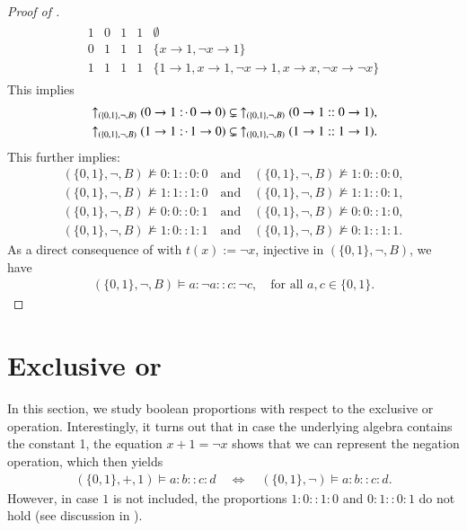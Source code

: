 \documentclass[11pt]{amsart}
\theoremstyle{definition} %
\newcommand{\righttherefore}{:\joinrel\cdot\,}
\begin{document}
\begin{proof}[Proof of ]
\begin{align*}
\begin{array}{cccc||l}
	1 & 0 & 1 & 1 & \emptyset\\ %
	0 & 1 & 1 & 1 & \{x\to 1,\neg x\to 1\}\\
	1 & 1 & 1 & 1 & \{1\to 1,x\to 1,\neg x\to 1,x\to x,\neg x\to\neg x\}
\end{array}
\end{align*} This implies
\begin{align*}
       &\uparrow_{(\{0,1\},\neg,B)}(0\to 1\righttherefore 0\to 0)\subsetneq\ \uparrow_{(\{0,1\},\neg,B)}(0\to 1::0\to 1),\\
       &\uparrow_{(\{0,1\},\neg,B)}(1\to 1\righttherefore 1\to 0)\subsetneq\ \uparrow_{(\{0,1\},\neg,B)}(1\to 1::1\to 1).
\end{align*} This further implies:
\begin{align} 
       \label{equ:BnegB_notmodels_0100_1000} (\{0,1\},\neg,B)\not\models 0:1::0:0 \quad\text{and}\quad (\{0,1\},\neg,B)\not\models 1:0::0:0,\\
       \label{equ:BnegB_notmodels_1110_1101} (\{0,1\},\neg,B)\not\models 1:1::1:0 \quad\text{and}\quad (\{0,1\},\neg,B)\not\models 1:1::0:1,\\
       \label{equ:BnegB_notmodels_0001_0010} (\{0,1\},\neg,B)\not\models 0:0::0:1 \quad\text{and}\quad (\{0,1\},\neg,B)\not\models 0:0::1:0,\\
       \label{equ:BnegB_notmodels_1011_0111} (\{0,1\},\neg,B)\not\models 1:0::1:1 \quad\text{and}\quad (\{0,1\},\neg,B)\not\models 0:1::1:1.
\end{align} As a direct consequence of  with $ t(x):=\neg x$, injective in $(\{0,1\},\neg,B)$, we have
\begin{align}\label{equ:BnegB_models_0110_1001} 
	(\{0,1\},\neg,B)\models a:\neg a::c:\neg c,\quad\text{for all $a,c\in\{0,1\}$}.
\end{align}
\end{proof}

\section{Exclusive or}\label{§:XOR}

In this section, we study boolean proportions with respect to the exclusive or operation. Interestingly, it turns out that in case the underlying algebra contains the constant 1, the equation $x+1=\neg x$ shows that we can represent the negation operation, which then yields
\begin{align*} 
	(\{0,1\},+,1)\models a:b::c:d \quad\Leftrightarrow\quad (\{0,1\},\neg)\models a:b::c:d.
\end{align*} However, in case $1$ is not included, the proportions $1:0::1:0$ and $0:1::0:1$ do not hold (see discussion in ).
\end{document}
